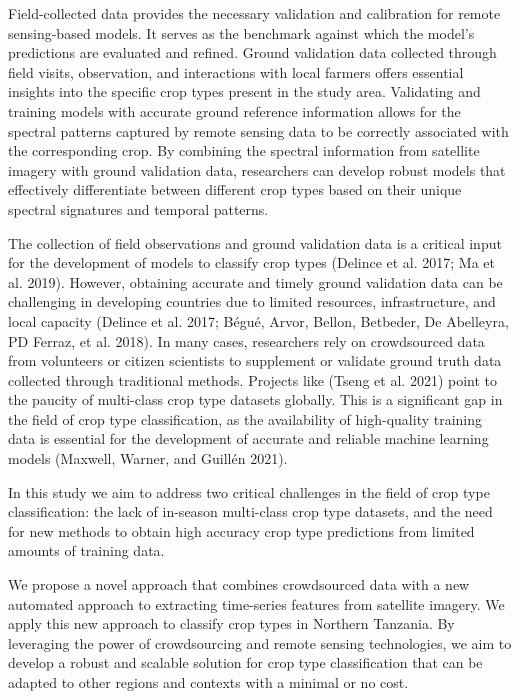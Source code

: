 \documentclass[
  journal,
  twocolumn]{IEEEtran}
\begin{document}
Field-collected data provides the necessary validation and calibration
for remote sensing-based models. It serves as the benchmark against
which the model's predictions are evaluated and refined. Ground
validation data collected through field visits, observation, and
interactions with local farmers offers essential insights into the
specific crop types present in the study area. Validating and training
models with accurate ground reference information allows for the
spectral patterns captured by remote sensing data to be correctly
associated with the corresponding crop. By combining the spectral
information from satellite imagery with ground validation data,
researchers can develop robust models that effectively differentiate
between different crop types based on their unique spectral signatures
and temporal patterns.

The collection of field observations and ground validation data is a
critical input for the development of models to classify crop types
(Delince et al. 2017; Ma et al. 2019). However, obtaining accurate and
timely ground validation data can be challenging in developing countries
due to limited resources, infrastructure, and local capacity (Delince et
al. 2017; Bégué, Arvor, Bellon, Betbeder, De Abelleyra, PD Ferraz, et
al. 2018). In many cases, researchers rely on crowdsourced data from
volunteers or citizen scientists to supplement or validate ground truth
data collected through traditional methods. Projects like (Tseng et al.
2021) point to the paucity of multi-class crop type datasets globally.
This is a significant gap in the field of crop type classification, as
the availability of high-quality training data is essential for the
development of accurate and reliable machine learning models (Maxwell,
Warner, and Guillén 2021).

In this study we aim to address two critical challenges in the field of
crop type classification: the lack of in-season multi-class crop type
datasets, and the need for new methods to obtain high accuracy crop type
predictions from limited amounts of training data.

We propose a novel approach that combines crowdsourced data with a new
automated approach to extracting time-series features from satellite
imagery. We apply this new approach to classify crop types in Northern
Tanzania. By leveraging the power of crowdsourcing and remote sensing
technologies, we aim to develop a robust and scalable solution for crop
type classification that can be adapted to other regions and contexts
with a minimal or no cost.
\end{document}
